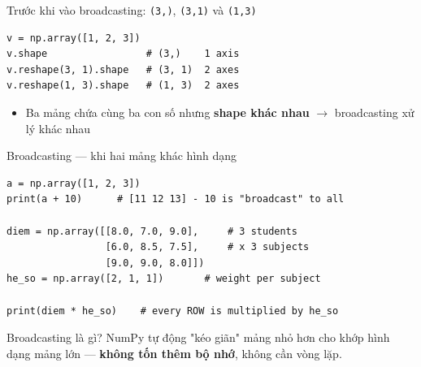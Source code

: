 \documentclass[11pt]{beamer}
\begin{document}
\begin{frame}[fragile]{Trước khi vào broadcasting: \texttt{(3,)}, \texttt{(3,1)} và \texttt{(1,3)}}
\begin{center}
\end{center}
\begin{lstlisting}
v = np.array([1, 2, 3])
v.shape                 # (3,)    1 axis
v.reshape(3, 1).shape   # (3, 1)  2 axes
v.reshape(1, 3).shape   # (1, 3)  2 axes
\end{lstlisting}
\begin{itemize}
  \item Ba mảng chứa cùng ba con số nhưng \textbf{shape khác nhau} $\to$ broadcasting xử lý khác nhau
\end{itemize}
\end{frame}

\begin{frame}[fragile]{Broadcasting --- khi hai mảng khác hình dạng}
\begin{lstlisting}
a = np.array([1, 2, 3])
print(a + 10)      # [11 12 13] - 10 is "broadcast" to all

diem = np.array([[8.0, 7.0, 9.0],     # 3 students
                 [6.0, 8.5, 7.5],     # x 3 subjects
                 [9.0, 9.0, 8.0]])
he_so = np.array([2, 1, 1])       # weight per subject

print(diem * he_so)    # every ROW is multiplied by he_so
\end{lstlisting}
\begin{block}{Broadcasting là gì?}
NumPy tự động "kéo giãn" mảng nhỏ hơn cho khớp hình dạng mảng lớn --- \textbf{không tốn thêm bộ nhớ}, không cần vòng lặp.
\end{block}
\end{frame}
\end{document}
